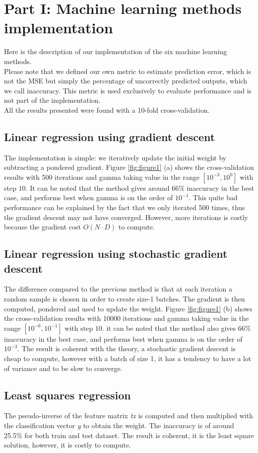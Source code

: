\documentclass[10pt,conference,compsocconf]{IEEEtran}
\begin{document}
\section{Part I: Machine learning methods implementation}
Here is the description of our implementation of the six machine learning methods.\\
Please note that we defined our own metric to estimate prediction error, which
is not the MSE but simply the percentage of uncorrectly predicted outputs, which
we call inaccuracy.
This metric is used exclusively to evaluate performance and is not part of the
implementation.\\
All the results presented were found with a 10-fold cross-validation.
 \subsection{Linear regression using gradient descent}
The implementation is simple: we iteratively update the initial weight by subtracting a pondered gradient.
Figure \ref{fig:figure1} (a) shows the cross-validation results with 500
iterations and gamma taking value in the range $[10^{-3}, 10^{0}]$ with step
$10$. It can be noted that the method gives around 66\% inaccuracy in the best
case, and performs best when gamma is on the order of $10^{-1}$. This quite bad
performance can be explained by the fact that we only iterated 500 times, thus
the gradient descent may not have converged. However, more iterations is costly
because the gradient cost $O(N\cdot D)$ to compute.

\subsection{Linear regression using stochastic gradient descent}
The difference compared to the previous method is that at each iteration a
random sample is chosen in order to
create size-1 batches. The gradient is then computed, pondered and used to
update the weight. Figure \ref{fig:figure1} (b) shows the cross-validation
results with 10000 iterations and gamma taking value in the range $[10^{-6},
10^{-1}]$ with step $10$. it can be noted that the method also gives 66\%
inaccuracy in the best case, and performs best when gamma is on the order of
$10^{-3}$. The result is coherent with the theory, a stochastic gradient descent
is cheap to compute, however with a batch of size 1, it has a tendency to have a
lot of variance and to be slow to converge.
\subsection{Least squares regression}
The pseudo-inverse of the feature matrix \textit{tx} is computed and then multiplied with the classification vector \textit{y} to obtain the weight.
The inaccuracy is of around 25.5\% for both train and test dataset. The result
is coherent, it is the least square solution, however, it is costly to compute.
\end{document}
